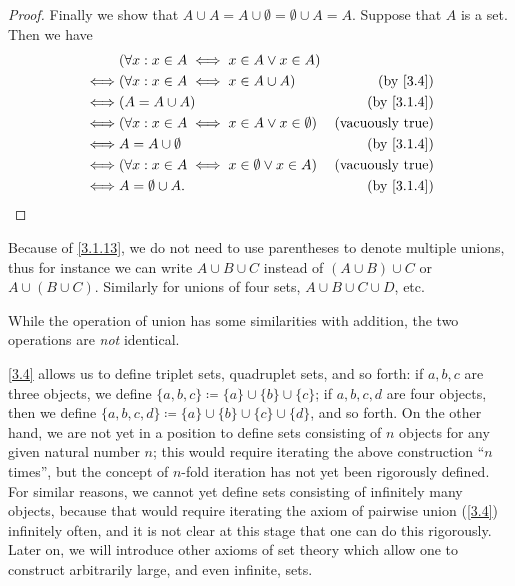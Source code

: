\begin{proof}
  Finally we show that \(A \cup A = A \cup \emptyset = \emptyset \cup A = A\).
  Suppose that \(A\) is a set.
  Then we have
  \begin{align*}
         & (\forall x : x \in A \iff x \in A \lor x \in A)                                    \\
    \iff & (\forall x : x \in A \iff x \in A \cup A)               & \text{(by \cref{3.4})}   \\
    \iff & (A = A \cup A)                                          & \text{(by \cref{3.1.4})} \\
    \iff & (\forall x : x \in A \iff x \in A \lor x \in \emptyset) & \text{(vacuously true)}  \\
    \iff & A = A \cup \emptyset                                    & \text{(by \cref{3.1.4})} \\
    \iff & (\forall x : x \in A \iff x \in \emptyset \lor x \in A) & \text{(vacuously true)}  \\
    \iff & A = \emptyset \cup A.                                   & \text{(by \cref{3.1.4})}
  \end{align*}
\end{proof}

\begin{note}
  Because of \cref{3.1.13}, we do not need to use parentheses to denote multiple unions, thus for instance we can write \(A \cup B \cup C\) instead of \((A \cup B) \cup C\) or \(A \cup (B \cup C)\).
  Similarly for unions of four sets, \(A \cup B \cup C \cup D\), etc.
\end{note}

\begin{rmk}\label{3.1.14}
  While the operation of union has some similarities with addition, the two operations are \emph{not} identical.
\end{rmk}

\begin{note}
  \cref{3.4} allows us to define triplet sets, quadruplet sets, and so forth: if \(a, b, c\) are three objects, we define \(\{a, b, c\} \coloneqq \{a\} \cup \{b\} \cup \{c\}\);
  if \(a, b, c, d\) are four objects, then we define \(\{a, b, c, d\} \coloneqq \{a\} \cup \{b\} \cup \{c\} \cup \{d\}\), and so forth.
  On the other hand, we are not yet in a position to define sets consisting of \(n\) objects for any given natural number \(n\);
  this would require iterating the above construction ``\(n\) times'', but the concept of \(n\)-fold iteration has not yet been rigorously defined.
  For similar reasons, we cannot yet define sets consisting of infinitely many objects, because that would require iterating the axiom of pairwise union (\cref{3.4}) infinitely often, and it is not clear at this stage that one can do this rigorously.
  Later on, we will introduce other axioms of set theory which allow one to construct arbitrarily large, and even infinite, sets.
\end{note}

